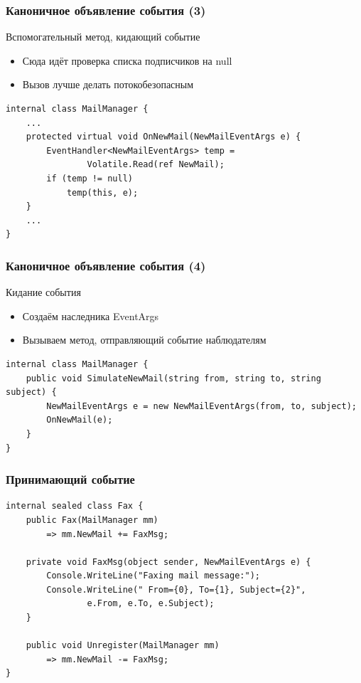 \documentclass{../../slides-style}
\begin{document}
    \begin{frame}[fragile]
        \frametitle{Каноничное объявление события (3)}
        Вспомогательный метод, кидающий событие
        \begin{itemize}
            \item Сюда идёт проверка списка подписчиков на null
            \item Вызов лучше делать потокобезопасным
        \end{itemize}
        \vspace{5mm}
        \begin{verbatim}
internal class MailManager {
    ...
    protected virtual void OnNewMail(NewMailEventArgs e) {
        EventHandler<NewMailEventArgs> temp = 
                Volatile.Read(ref NewMail);
        if (temp != null) 
            temp(this, e);
    }
    ...
}
        \end{verbatim}
    \end{frame}

    \begin{frame}[fragile]
        \frametitle{Каноничное объявление события (4)}
        Кидание события
        \begin{itemize}
            \item Создаём наследника EventArgs
            \item Вызываем метод, отправляющий событие наблюдателям
        \end{itemize}
        \vspace{5mm}
        \begin{verbatim}
internal class MailManager {
    public void SimulateNewMail(string from, string to, string subject) {
        NewMailEventArgs e = new NewMailEventArgs(from, to, subject);
        OnNewMail(e);
    }
}
        \end{verbatim}
    \end{frame}

    \begin{frame}[fragile]
        \frametitle{Принимающий событие}
        \begin{verbatim}
internal sealed class Fax {
    public Fax(MailManager mm)
        => mm.NewMail += FaxMsg;

    private void FaxMsg(object sender, NewMailEventArgs e) {
        Console.WriteLine("Faxing mail message:");
        Console.WriteLine(" From={0}, To={1}, Subject={2}",
                e.From, e.To, e.Subject);
    }

    public void Unregister(MailManager mm)
        => mm.NewMail -= FaxMsg;
}
        \end{verbatim}
    \end{frame}
\end{document}

